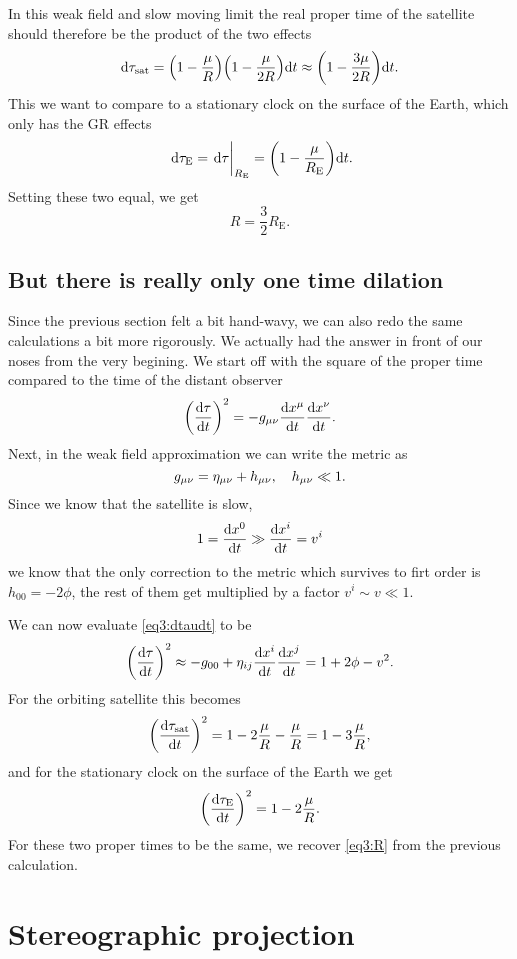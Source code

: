 \documentclass[11pt,a4paper, 
swedish, english %
]{article}
\newcommand{\E}{\text{E}}
\begin{document}
In this weak field and slow moving limit the real proper time of the
satellite should therefore be the product of the two effects
\begin{equation}
\mathrm{d}\tau_\text{sat}=\qty(1-\frac{\mu}{R})\qty(1-\frac{\mu}{2R})\mathrm{d}{t}
\approx\qty(1-\frac{3\mu}{2R})\mathrm{d}{t}.
\end{equation}
This we want to compare to a stationary clock on the surface of the
Earth, which only has the GR effects
\begin{equation}\
\rd\tau_\E=\eval{\rd\tau}_{R_\E}=\qty(1-\frac{\mu}{R_\E})\rd{t}.
\end{equation}
Setting these two equal, we get
\begin{equation}\label{eq3:R}
R=\frac{3}{2}R_\E.
\end{equation}


\subsection{But there is really only one time dilation}
Since the previous section felt a bit hand-wavy, we can also redo the
same calculations a bit more rigorously. We actually had the answer in
front of our noses from the very begining. We start off with the
square of the proper time compared to the time of the distant observer 
\begin{equation}\label{eq3:dtaudt}
\qty(\frac{\mathrm{d}\tau}{\mathrm{d}{t}})^2=
-g_{\mu\nu}\frac{\mathrm{d}{x}^\mu}{\mathrm{d}{t}}\frac{\mathrm{d}{x}^\nu}{\mathrm{d}{t}}.
\end{equation}
Next, in the weak field approximation we can write the metric as
\begin{equation}
g_{\mu\nu}=\eta_{\mu\nu}+h_{\mu\nu}\qc h_{\mu\nu}\ll1.
\end{equation}
Since we know that the satellite is slow,
\begin{equation}
1=\dv{x^0}{t}\gg\dv{x^i}{t}= v^i
\end{equation}
we know that the only correction to the metric which survives to firt
order is $h_{00}=-2\phi$, the rest of them get multiplied by a factor
$v^i\sim v\ll1$.

We can now evaluate \eqref{eq3:dtaudt} to be
\begin{equation}
\qty(\frac{\mathrm{d}\tau}{\mathrm{d}{t}})^2\approx
-g_{00}+\eta_{ij}\frac{\mathrm{d}{x}^i}{\mathrm{d}{t}}\frac{\mathrm{d}{x}^j}{\mathrm{d}{t}}
=1+2\phi-v^2.
\end{equation}
For the orbiting satellite this becomes
\begin{equation}
\qty(\frac{\mathrm{d}\tau_\text{sat}}{\mathrm{d}{t}})^2
=1-2\frac{\mu}{R}-\frac{\mu}{R}
=1-3\frac{\mu}{R},
\end{equation}
and for the stationary clock on the surface of the Earth we get
\begin{equation}
\qty(\frac{\mathrm{d}\tau_\text{E}}{\mathrm{d}{t}})^2=1-2\frac{\mu}{R}.
\end{equation}
For these two proper times to be the same, we recover \eqref{eq3:R}
from the previous calculation.


\section{Stereographic projection}
\swapcommands{\phi}{\varphi}


\end{document}
